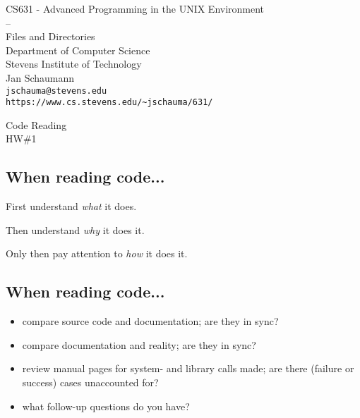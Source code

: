 \documentclass[xga]{xdvislides}
\begin{document}
\setfontphv

\lhead{\slidetitle}
\cfoot{\relax}
\rfoot{\Gray{\today}}

\vspace*{\fill}
\begin{center}
	\Hugesize
		CS631 - Advanced Programming in the UNIX Environment\\
		-- \\
		Files and Directories
	\hspace*{5mm}\blueline\\ [1em]
	\Normalsize
		Department of Computer Science\\
		Stevens Institute of Technology\\
		Jan Schaumann\\
		\verb+jschauma@stevens.edu+\\
		\verb+https://www.cs.stevens.edu/~jschauma/631/+
\end{center}
\vspace*{\fill}

\newpage

\vspace*{\fill}
\begin{center}
  \Hugesize
	Code Reading
	\hspace*{5mm}\blueline\\ [1em]
	HW\#1
  \Normalsize
\end{center}
\vspace*{\fill}


\subsection{When reading code...}

\vspace*{\fill}
\begin{center}
\Huge
First understand {\em what} it does. \\
\vspace{.5in}

Then understand {\em why} it does it. \\
\vspace{.5in}

Only then pay attention to {\em how} it does it.
\Normalsize
\end{center}
\vspace*{\fill}

\subsection{When reading code...}
\begin{itemize}
	\item compare source code and documentation; are they in sync?
	\item compare documentation and reality; are they in sync?
	\item review manual pages for system- and library calls made; are
		there (failure or success) cases unaccounted for?
	\item what follow-up questions do you have?
\end{itemize}
\end{document}

